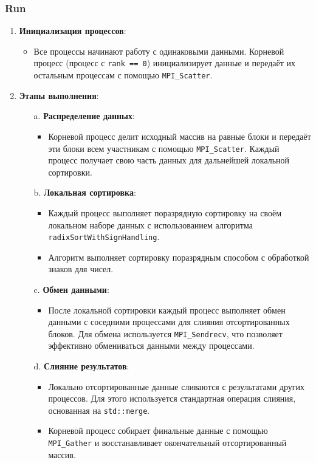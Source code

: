 \documentclass[12pt]{article}
\begin{document}
\subsubsection*{Run}

\begin{enumerate}
    \item \textbf{Инициализация процессов}: 
    \begin{itemize}
        \item Все процессы начинают работу с одинаковыми данными. Корневой процесс (процесс с \texttt{rank == 0}) инициализирует данные и передаёт их остальным процессам с помощью \texttt{MPI\_Scatter}.
    \end{itemize}

    \item \textbf{Этапы выполнения}: 
    \begin{enumerate}
        \item[a.] \textbf{Распределение данных}:
        \begin{itemize}
            \item Корневой процесс делит исходный массив на равные блоки и передаёт эти блоки всем участникам с помощью \texttt{MPI\_Scatter}. Каждый процесс получает свою часть данных для дальнейшей локальной сортировки.
        \end{itemize}

        \item[b.] \textbf{Локальная сортировка}:
        \begin{itemize}
            \item Каждый процесс выполняет поразрядную сортировку на своём локальном наборе данных с использованием алгоритма \texttt{radixSortWithSignHandling}.
            \item Алгоритм выполняет сортировку поразрядным способом с обработкой знаков для чисел.
        \end{itemize}

        \item[c.] \textbf{Обмен данными}:
        \begin{itemize}
            \item После локальной сортировки каждый процесс выполняет обмен данными с соседними процессами для слияния отсортированных блоков. Для обмена используется \texttt{MPI\_Sendrecv}, что позволяет эффективно обмениваться данными между процессами.
        \end{itemize}

        \item[d.] \textbf{Слияние результатов}:
        \begin{itemize}
            \item Локально отсортированные данные сливаются с результатами других процессов. Для этого используется стандартная операция слияния, основанная на \texttt{std::merge}.
            \item Корневой процесс собирает финальные данные с помощью \texttt{MPI\_Gather} и восстанавливает окончательный отсортированный массив.
        \end{itemize}
    \end{enumerate}
\end{enumerate}
\end{document}
